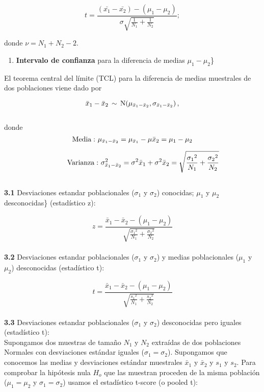 \documentclass[
]{agujournal2019}
\providecommand{\tightlist}{%
  \setlength{\itemsep}{0pt}\setlength{\parskip}{0pt}}\usepackage{longtable,booktabs,array}
\begin{document}
\[t=\frac{(\bar{x_1}-\bar{x_2})-(\mu_1-\mu_2)}{\sigma\sqrt{\frac{1}{N_1} + \frac{1}{N_2}}};\]

donde \(\nu=N_1+N_2-2\).\\

\begin{enumerate}
\def\labelenumi{(\arabic{enumi})}
\setcounter{enumi}{2}
\tightlist
\item
  \textbf{Intervalo de confianza} para la diferencia de medias
  \(\mu_1 - \mu_2\)\}\\
\end{enumerate}

El teorema central del límite (TCL) para la diferencia de medias
muestrales de dos poblaciones viene dado por

\[\bar{x}_1-\bar{x}_2\,\sim\,{\rm N}(\mu_{\bar{x}_1-\bar{x}_2},\sigma_{\bar{x}_1-\bar{x}_2})\,,\]\\

donde
\[{\rm Media:}\,\,\mu_{\bar{x}_1-\bar{x}_2}=\mu_{\bar{x}_1}-\mu{\bar{x}_2}=\mu_1-\mu_2\]

\[\,\,\,\,\,\,\,\,\,\,\,\,\,\,\,\,\,\,{\rm Varianza:}\,\,\sigma^2_{\bar{x}_1-\bar{x}_2}=
   \sigma^2{\bar{x}_1}+\sigma^2{\bar{x}_2}=
   \sqrt{  \frac{{\sigma_1}^2}{N_1} + \frac{{\sigma_2}^2}{N_2} }\]\\

\textbf {3.1} Desviaciones estandar poblacionales (\(\sigma_1\) y
\(\sigma_2\)) conocidas; \(\mu_1\) y \(\mu_2\) desconocidas\}
(estadístico z):

\[z=\frac{\bar{x}_1-\bar{x}_2-(\mu_1-\mu_2)}
         {\sqrt{\frac{{\sigma_1}^2}{N_1}+\frac{{\sigma_2}^2}{N_2}}}\]\\

\textbf{3.2} Desviaciones estandar poblacionales (\(\sigma_1\) y
\(\sigma_2\)) y medias poblacionales (\(\mu_1\) y \(\mu_2\))
desconocidas (estadístico t):

\[t=\frac{\bar{x}_1-\bar{x}_2-(\mu_1-\mu_2)}
              {\sqrt{\frac{{s_1}^2}{N_1}+\frac{{s_2}^2}{N_2}}}\]\\

\textbf{3.3} Desviaciones estandar poblacionales (\(\sigma_1\) y
\(\sigma_2\)) desconocidas pero iguales (estadístico t):\\

Supongamos dos muestras de tamaño \(N_1\) y \(N_2\) extraídas de dos
poblaciones Normales con desviaciones estándar iguales
(\(\sigma_1=\sigma_2\)). Supongamos que conocemos las medias y
desviaciones estándar muestrales \(\bar{x}_1\) y \(\bar{x}_2\) y \(s_1\)
y \(s_2\). Para comprobar la hipótesis nula \(H_o\) que las muestran
proceden de la misma población (\(\mu_1=\mu_2\) y \(\sigma_1=\sigma_2\))
usamos el estadístico t-score (o pooled t):
\end{document}
